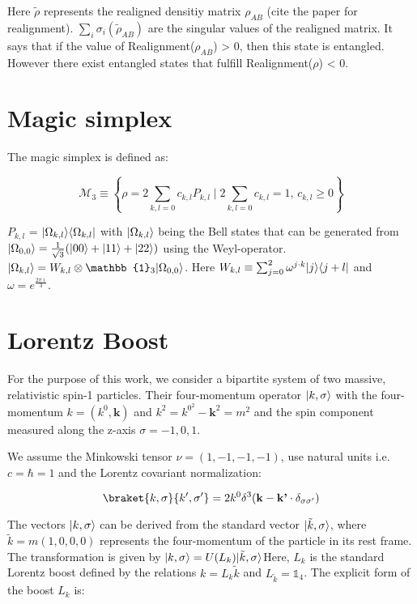Here $\tilde{\rho}$ represents the realigned densitiy matrix $\rho_{AB}$ (cite the paper for realignment). $\sum_i\sigma_i(\tilde{\rho}_{AB})$ are the singular values of the realigned matrix.
It says that if the value of Realignment($\rho_{AB}$) > 0, then this state is entangled. However there exist entangled states that fulfill Realignment($\rho$) < 0.

\section{Magic simplex}

The magic simplex is defined as:

\begin{equation}
    \mathcal{M}_3 \equiv \left\{\rho = 2 \sum_{k,l=0} c_{k,l} P_{k,l} \mid 2 \sum_{k,l=0} c_{k,l} = 1, \, c_{k,l} \geq 0\right\}
\end{equation}

$P_{k,l}$ = $\lvert\Omega_{k,l}\rangle\langle\Omega_{k,l}\rvert$ with $\lvert\Omega_{k,l}\rangle$ being the Bell states that can be generated from $\lvert\Omega_{0,0}\rangle = \frac{1}{\sqrt{3}}(\lvert00\rangle + \lvert11\rangle + \lvert22\rangle)$ 
using the Weyl-operator. $\ket{\Omega_{k,l}} = W_{k,l} \otimes \mathbb{1}_3 \ket{\Omega_{0,0}}$. Here $W_{k,l} \equiv \sum_{j=0}^{2}\omega^{j\cdot k}\lvert j\rangle\langle j+l\rvert$ and $\omega = e^{\frac{2\pi\imath}{3}}$.

\section{Lorentz Boost}

For the purpose of this work, we consider a bipartite system of two massive, relativistic spin-1 particles. Their four-momentum operator $\lvert k,\sigma\rangle$ with the four-momentum $k = (k^0,\textbf{k})$ and $k^2 = k^0^2 - \textbf{k}^2 = m^2$ 
and the spin component measured along the z-axis $\sigma = -1,0,1$.

We assume the Minkowski tensor $\nu = (1,-1,-1,-1)$, use natural units i.e. $c = \hbar = 1$ and the Lorentz covariant normalization: 

\begin{equation}
    \braket{k,\sigma}{k',\sigma'} = 2 k^0 \delta^3(\textbf{k} - \textbf{k'} \cdot \delta_{\sigma\sigma'})
\end{equation}

The vectors $\lvert k,\sigma\rangle$ can be derived from the standard vector $\lvert\tilde{k},\sigma\rangle$, where $\tilde{k} = m(1,0,0,0)$ represents the four-momentum of the particle in its rest frame. 
The transformation is given by $\lvert k,\sigma\rangle = U(L_k)\lvert\tilde{k},\sigma\rangle$Here, $L_k$ is the standard Lorentz boost defined by the relations $k = L_k\tilde{k}$ and $L_{\tilde{k}} = \mathds{1}_4$.
The explicit form of the boost $L_k$ is:

